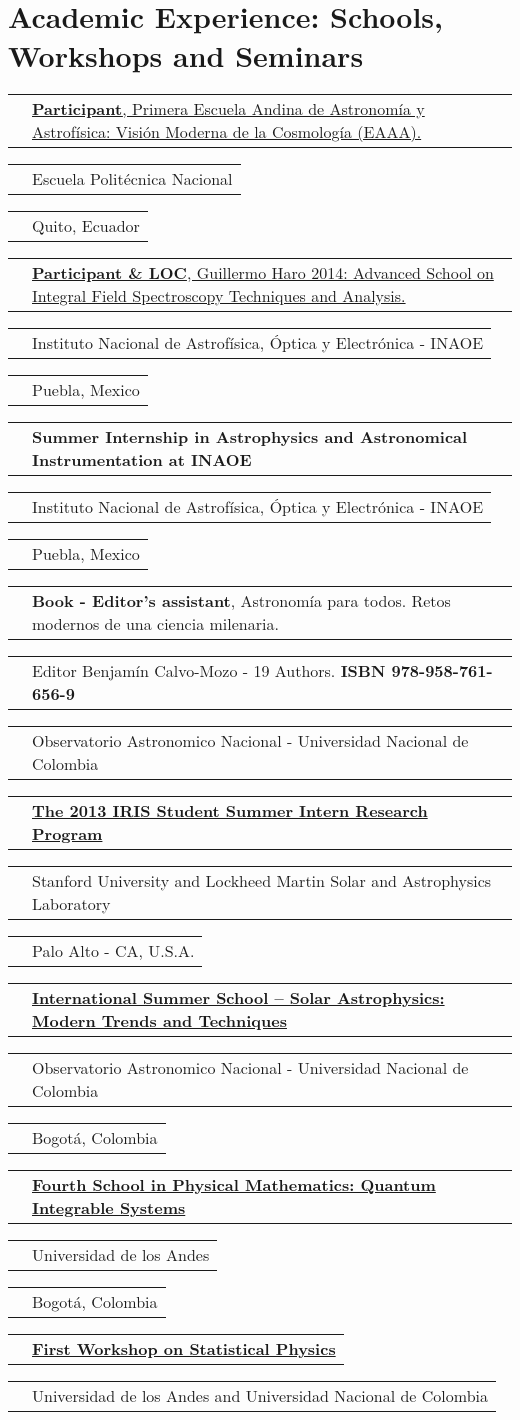 \documentclass[11pt,letterpaper,sans]{moderncv}        %
\makeatletter
\renewcommand*{\cvitem}[3][.25em]{%
  \begin{tabular}{@{}p{\hintscolumnwidth}@{\hspace{\separatorcolumnwidth}}p{\maincolumnwidth}@{}}%
      \raggedleft\hintstyle{#2} &{#3}%
  \end{tabular}%
  \par\addvspace{#1}}
\makeatother
\begin{document}
\section{Academic Experience: Schools, Workshops and Seminars}
\cvitem{Dec 8 - 12}{\href{http://departamentodefisicaeventos.epn.edu.ec/}{\textbf{Participant}, Primera Escuela Andina de Astronom\'{i}a y Astrof\'{i}sica: Visi\'on Moderna de la Cosmolog\'{i}a (EAAA).}}
\cvitem{2014}{Escuela Polit\'ecnica Nacional}
\cvitem{}{Quito, Ecuador}
\cvitem{Aug 25-Sep 5}{\href{http://xilonen.inaoep.mx/~progharo/gh2014School/}{\textbf{Participant \& LOC}, Guillermo Haro 2014: Advanced School on Integral Field Spectroscopy Techniques and Analysis.}}
\cvitem{2014}{Instituto Nacional de Astrof\'{i}sica, \'{O}ptica y Electr\'onica - INAOE}
\cvitem{}{Puebla, Mexico}
\cvitem{Jun - Aug}{\textbf{Summer Internship in Astrophysics and Astronomical Instrumentation at INAOE}}
\cvitem{2014}{Instituto Nacional de Astrof\'{i}sica, \'{O}ptica y Electr\'onica - INAOE}
\cvitem{}{Puebla, Mexico}
\cvitem{2014}{\textbf{Book - Editor's assistant}, Astronom\'{i}a para todos. Retos modernos de una ciencia milenaria.}
\cvitem{}{Editor Benjam\'{i}n Calvo-Mozo - 19 Authors. \textbf{ISBN 978-958-761-656-9}}
\cvitem{}{Observatorio Astronomico Nacional - Universidad Nacional de Colombia}
\cvitem{Jun - Aug}{\href{http://solar-center.stanford.edu/IRIS/SummerProgram/}{\textbf{The 2013 IRIS Student Summer Intern Research Program}}}
\cvitem{2013}{Stanford University and Lockheed Martin Solar and Astrophysics Laboratory}
\cvitem{}{Palo Alto - CA, U.S.A.}
\cvitem{Jun - Jul}{\href{http://www.observatorio.unal.edu.co/eventos/solarschool/}{\textbf{International Summer School – Solar Astrophysics: Modern Trends and Techniques}}}
\cvitem{2012}{Observatorio Astronomico Nacional - Universidad Nacional de Colombia}
\cvitem{}{Bogot\'a, Colombia}
\cvitem{May 28 - 1}{\href{http://matematicas.uniandes.edu.co/~cursillo_gr/escuela2012/}{\textbf{Fourth School in Physical Mathematics: Quantum Integrable Systems}}}
\cvitem{2012}{Universidad de los Andes}
\cvitem{}{Bogot\'a, Colombia}
\cvitem{Sept 12 - 16}{\href{http://www.ciencias.unal.edu.co/workshopstatisticalphysics/}{\textbf{First Workshop on Statistical Physics}}}
\cvitem{2011}{Universidad de los Andes and Universidad Nacional de Colombia}
\end{document}
